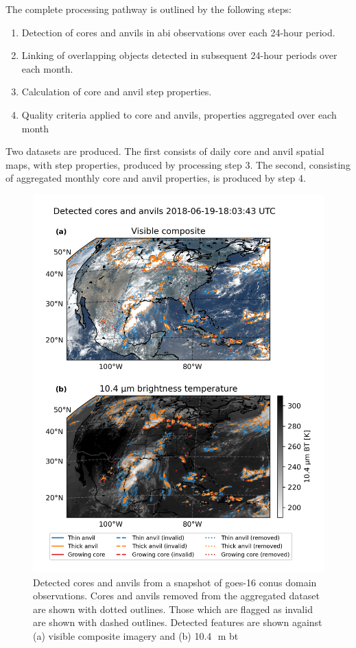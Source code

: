 The complete processing pathway is outlined by the following steps:

\begin{enumerate}
    \item Detection of cores and anvils in \acrshort{abi} observations over each 24-hour period.
    \item Linking of overlapping objects detected in subsequent 24-hour periods over each month.
    \item Calculation of core and anvil step properties. 
    \item Quality criteria applied to core and anvils, properties aggregated over each month
\end{enumerate}

Two datasets are produced. The first consists of daily core and anvil spatial maps, with step properties, produced by processing step 3. 
The second, consisting of aggregated monthly core and anvil properties, is produced by step 4.

\begin{figure}[tp]
    \centering
    \includegraphics[width=\textwidth]{figures/chapter2_02.png}
    \caption[
    Detected cores and anvils from a snapshot of \acrshort{goes}-16 \acrshort{conus} domain observations
    ]{
    Detected cores and anvils from a snapshot of \acrshort{goes}-16 \acrshort{conus} domain observations. Cores and anvils removed from the aggregated dataset are shown with dotted outlines. Those which are flagged as invalid are shown with dashed outlines. Detected features are shown against (a) visible composite imagery and (b) 10.4\,\unit{\mu m} \acrshort{bt}
    }
    \label{fig:conus_detected_dccs}
\end{figure}

